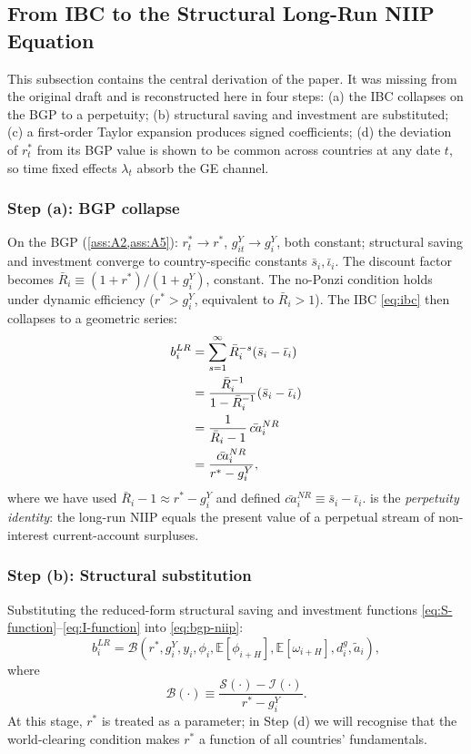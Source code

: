 \subsection{From IBC to the Structural Long-Run NIIP Equation}
\label{sec:theory:linearization}

This subsection contains the central derivation of the paper. It was missing
from the original draft and is reconstructed here in four steps: (a) the IBC
collapses on the BGP to a perpetuity; (b) structural saving and investment are
substituted; (c) a first-order Taylor expansion produces signed coefficients;
(d) the deviation of $r_t^*$ from its BGP value is shown to be common across
countries at any date $t$, so time fixed effects $\lambda_t$ absorb the GE
channel.

\subsubsection*{Step (a): BGP collapse}

On the BGP (\cref{ass:A2,ass:A5}): $r_t^*\to r^*$, $g_{it}^Y\to g_i^Y$, both
constant; structural saving and investment converge to country-specific
constants $\bar s_i,\bar\iota_i$. The discount factor becomes
$\bar R_i\equiv(1+r^*)/(1+g_i^Y)$, constant. The no-Ponzi condition holds
under dynamic efficiency ($r^*>g_i^Y$, equivalent to $\bar R_i>1$). The IBC
\eqref{eq:ibc} then collapses to a geometric series:
\begin{align}
b_i^{LR}&=\sum_{s=1}^{\infty}\bar R_i^{-s}(\bar s_i-\bar\iota_i)\notag\\
&=\frac{\bar R_i^{-1}}{1-\bar R_i^{-1}}(\bar s_i-\bar\iota_i)\notag\\
&=\frac{1}{\bar R_i-1}\,\bar{ca}_i^{NR}\notag\\
&=\frac{\bar{ca}_i^{NR}}{r^*-g_i^Y},
\label{eq:bgp-niip}
\end{align}
where we have used $\bar R_i-1\approx r^*-g_i^Y$ and defined
$\bar{ca}_i^{NR}\equiv \bar s_i-\bar\iota_i$.  is the
\emph{perpetuity identity}: the long-run NIIP equals the present value of a
perpetual stream of non-interest current-account surpluses.

\subsubsection*{Step (b): Structural substitution}

Substituting the reduced-form structural saving and investment functions
\eqref{eq:S-function}--\eqref{eq:I-function} into \eqref{eq:bgp-niip}:
\begin{equation}
b_i^{LR}=\mathcal{B}(r^*,g_i^Y,y_i,\phi_i,\mathbb{E}[\phi_{i+H}],\mathbb{E}[\omega_{i+H}],d_i^g,\tilde a_i),
\label{eq:structural-niip}
\end{equation}
where
\[
\mathcal{B}(\cdot)\equiv \frac{\mathcal{S}(\cdot)-\mathcal{I}(\cdot)}{r^*-g_i^Y}.
\]
At this stage, $r^*$ is treated as a parameter; in Step (d) we will recognise
that the world-clearing condition makes $r^*$ a function of all countries'
fundamentals.


